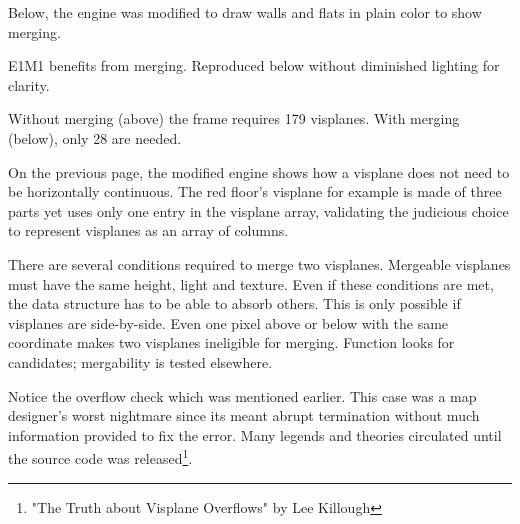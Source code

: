 
\vspace{4pt}

Below, the engine was modified to draw walls and flats in plain color to show merging.

\vspace{5pt}




 \label{complex_scene_plain_light.png}



E1M1 benefits from merging. Reproduced below without diminished lighting for clarity.

\vspace{2mm}





Without merging (above) the frame requires 179 visplanes. With merging (below), only 28 are needed.

\vspace{2mm}
\par \pagebreak
On the previous page, the modified engine shows how a visplane does not need to be horizontally continuous. The red floor's visplane for example is made of three parts yet uses only one entry in the visplane array, validating the judicious choice to represent visplanes as an array of columns.\\
\par
There are several conditions required to merge two visplanes. Mergeable visplanes must have the same height, light and texture. Even if these conditions are met, the data structure has to be able to absorb others. This is only possible if visplanes are side-by-side. Even one pixel above or below with the same  coordinate makes two visplanes ineligible for merging. Function  looks for candidates; mergability is tested elsewhere.\\
\par
{}
\par
Notice the overflow check which was mentioned earlier. This case was a map designer's worst nightmare since its meant abrupt termination without much information provided to fix the error. Many legends and theories circulated until the source code was released\footnote{"The Truth about Visplane Overflows" by Lee Killough}.





